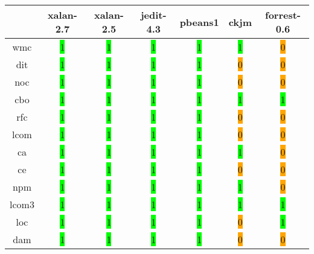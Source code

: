 \begin{table}[H]
\centering
    \begin{tabular}{|c|c|c|c|c|c|c|}
        \hline
         & xalan-2.7 & xalan-2.5 & jedit-4.3 & pbeans1 & ckjm & forrest-0.6 \\ \hline
        \acrshort{wmc} & \colorbox{lime}{1} & \colorbox{lime}{1} & \colorbox{lime}{1} & \colorbox{lime}{1} & \colorbox{lime}{1} & \colorbox{orange}{0} \\ \hline
        \acrshort{dit} & \colorbox{lime}{1} & \colorbox{lime}{1} & \colorbox{lime}{1} & \colorbox{lime}{1} & \colorbox{orange}{0} & \colorbox{orange}{0} \\ \hline
        \acrshort{noc} & \colorbox{lime}{1} & \colorbox{lime}{1} & \colorbox{lime}{1} & \colorbox{lime}{1} & \colorbox{orange}{0} & \colorbox{orange}{0} \\ \hline
        \acrshort{cbo} & \colorbox{lime}{1} & \colorbox{lime}{1} & \colorbox{lime}{1} & \colorbox{lime}{1} & \colorbox{lime}{1} & \colorbox{lime}{1} \\ \hline
        \acrshort{rfc} & \colorbox{lime}{1} & \colorbox{lime}{1} & \colorbox{lime}{1} & \colorbox{lime}{1} & \colorbox{orange}{0} & \colorbox{orange}{0} \\ \hline
        \acrshort{lcom} & \colorbox{lime}{1} & \colorbox{lime}{1} & \colorbox{lime}{1} & \colorbox{lime}{1} & \colorbox{orange}{0} & \colorbox{orange}{0} \\ \hline
        \acrshort{ca} & \colorbox{lime}{1} & \colorbox{lime}{1} & \colorbox{lime}{1} & \colorbox{lime}{1} & \colorbox{lime}{1} & \colorbox{orange}{0} \\ \hline
        \acrshort{ce} & \colorbox{lime}{1} & \colorbox{lime}{1} & \colorbox{lime}{1} & \colorbox{lime}{1} & \colorbox{orange}{0} & \colorbox{orange}{0} \\ \hline
        \acrshort{npm} & \colorbox{lime}{1} & \colorbox{lime}{1} & \colorbox{lime}{1} & \colorbox{lime}{1} & \colorbox{lime}{1} & \colorbox{orange}{0} \\ \hline
        \acrshort{lcom3} & \colorbox{lime}{1} & \colorbox{lime}{1} & \colorbox{lime}{1} & \colorbox{lime}{1} & \colorbox{lime}{1} & \colorbox{lime}{1} \\ \hline
        \acrshort{loc} & \colorbox{lime}{1} & \colorbox{lime}{1} & \colorbox{lime}{1} & \colorbox{lime}{1} & \colorbox{orange}{0} & \colorbox{lime}{1} \\ \hline
        \acrshort{dam} & \colorbox{lime}{1} & \colorbox{lime}{1} & \colorbox{lime}{1} & \colorbox{lime}{1} & \colorbox{orange}{0} & \colorbox{orange}{0} \\ \hline

\end{tabular}
\end{table}
